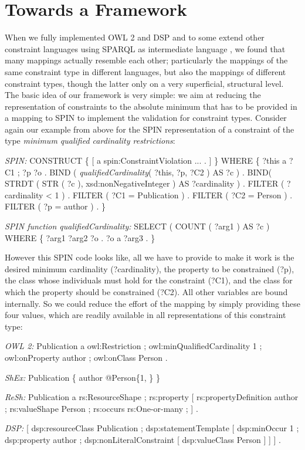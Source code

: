 \documentclass[a4paper,fontsize=11pt]{scrartcl}
\begin{document}
\section{Towards a Framework} 
\label{sec:vocabulary}

When we fully implemented OWL 2 and DSP and to some extend other constraint languages using SPARQL as intermediate language \cite{BoschEckert2014-2}, we found that many mappings actually resemble each other; particularly the mappings of the same constraint type in different languages, but also the mappings of different constraint types, though the latter only on a very superficial, structural level. The basic idea of our framework is very simple: we aim at reducing the representation of constraints to the absolute minimum that has to be provided in a mapping to SPIN to implement the validation for constraint types.
Consider again our example from above for the SPIN representation of a constraint of the type \emph{minimum qualified cardinality restrictions}:

\begin{ex}[commandchars=\\\{\}]
\textit{SPIN:} CONSTRUCT \{ [ a spin:ConstraintViolation ... . ] \} WHERE \{ 
          ?this 
              a ?C1 ;
              ?p ?o .
          BIND ( \textit{qualifiedCardinality}( ?this, ?p, ?C2 ) AS ?c ) .
          BIND( STRDT ( STR ( ?c ), xsd:nonNegativeInteger ) AS ?cardinality ) .
          FILTER ( ?cardinality < 1 ) . 
          FILTER ( ?C1 = Publication ) .
          FILTER ( ?C2 = Person ) .
          FILTER ( ?p = author ) . \}
						
\textit{SPIN function qualifiedCardinality:}										
SELECT ( COUNT ( ?arg1 ) AS ?c ) WHERE \{ ?arg1 ?arg2 ?o . ?o a ?arg3 . \}
\end{ex}

However this SPIN code looks like, all we have to provide to make it work is the desired minimum cardinality (?cardinality), the property to be constrained (?p), the class whose individuals must hold for the constraint (?C1), and the class for which the property should be constrained (?C2). All other variables are bound internally. So we could reduce the effort of the mapping by simply providing these four values, which are readily available in all representations of this constraint type:

\begin{ex}[commandchars=\\\{\}]
\textit{OWL 2:} Publication a owl:Restriction ;
          owl:minQualifiedCardinality 1 ;
          owl:onProperty author ;
          owl:onClass Person .
		
\textit{ShEx:} Publication \{ author @Person\{1, \} \}

\textit{ReSh:} Publication a rs:ResourceShape ; rs:property [
          rs:propertyDefinition author ;
          rs:valueShape Person ;
          rs:occurs rs:One-or-many ; ] .
		
\textit{DSP:} [ dsp:resourceClass Publication ; dsp:statementTemplate [ 
          dsp:minOccur 1 ; 
          dsp:property author ; 
          dsp:nonLiteralConstraint [ dsp:valueClass Person ] ] ] .
\end{ex}
\end{document}

